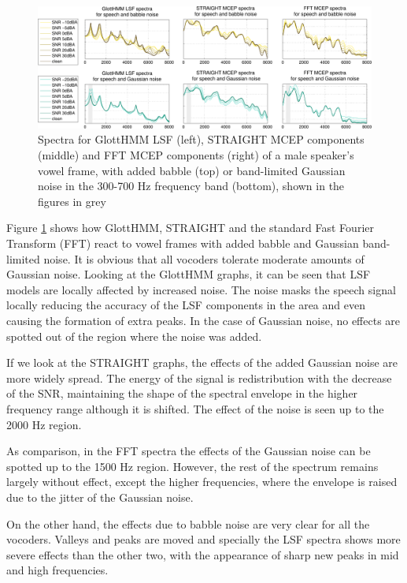 \begin{figure}[!htb]
\begin{centering}
\includegraphics[width=\textwidth]{images/vowel_frame_and_noise_w_fft.pdf}
\caption{Spectra for GlottHMM LSF (left), STRAIGHT MCEP components (middle) and FFT MCEP components (right) of a male speaker's vowel frame, with added babble (top) or band-limited Gaussian noise in the 300-700 Hz frequency band (bottom), shown in the figures in grey \cite{moreno_interspeech}}
\label{fig:different_specs_noise}
\end{centering}
\end{figure}

Figure \ref{fig:different_specs_noise} shows how GlottHMM, STRAIGHT and the standard Fast Fourier Transform (FFT) react to vowel frames with added babble and Gaussian band-limited noise.
%
It is obvious that all vocoders tolerate moderate amounts of Gaussian noise.
%
Looking at the GlottHMM graphs, it can be seen that LSF models are locally affected by increased noise.
%
The noise masks the speech signal locally reducing the accuracy of the LSF components in the area and even causing the formation of extra peaks.
%
In the case of Gaussian noise, no effects are spotted out of the region where the noise was added. 

If we look at the STRAIGHT graphs, the effects of the added Gaussian noise are more widely spread.
%
The energy of the signal is redistribution with the decrease of the SNR, maintaining the shape of the spectral envelope in the higher frequency range although it is shifted.
%
The effect of the noise is seen up to the 2000 Hz region.
%

As comparison, in the FFT spectra the effects of the Gaussian noise can be spotted up to the 1500 Hz region.
%
However, the rest of the spectrum remains largely without effect, except the higher frequencies, where the envelope is raised due to the jitter of the Gaussian noise.

On the other hand, the effects due to babble noise are very clear for all the vocoders.
%
Valleys and peaks are moved and specially the LSF spectra shows more severe effects than the other two, with the appearance of sharp new peaks in mid and high frequencies.


